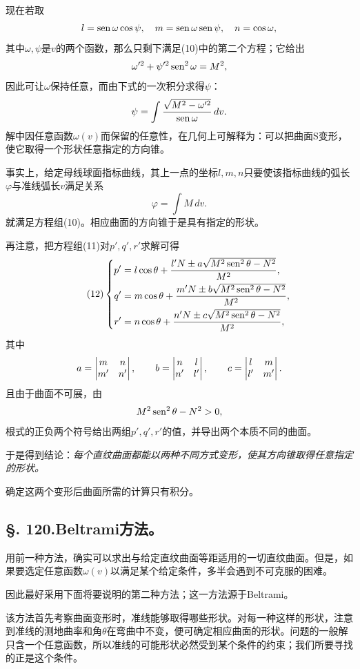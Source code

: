 现在若取
\[
 l=\operatorname{sen}\omega\cos\psi,
 \quad
 m=\operatorname{sen}\omega\operatorname{sen}\psi,
 \quad
 n=\cos\omega,
\]
其中\(\omega,\psi\)是\(v\)的两个函数，那么只剩下满足(10)中的第二个方程；它给出
\[
 \omega'^2+\psi'^2\operatorname{sen}^2\omega=M^2,
\]
因此可让\(\omega\)保持任意，而由下式的一次积分求得\(\psi\)：
\[
 \psi=\int\frac{\sqrt{M^2-\omega'^2}}{\operatorname{sen}\omega}\,dv.
\]
解中因任意函数\(\omega(v)\)而保留的任意性，在几何上可解释为：可以把曲面S变形，使它取得一个形状任意指定的方向锥。

事实上，给定母线球面指标曲线，其上一点的坐标\(l,m,n\)只要使该指标曲线的弧长\(\varphi\)与准线弧长\(v\)满足关系
\[
 \varphi=\int M\,dv.
\]
就满足方程组(10)。相应曲面的方向锥于是具有指定的形状。

再注意，把方程组(11)对\(p',q',r'\)求解可得
\begin{equation}\tag{12}
\left\{
\begin{aligned}
 p'&=l\cos\theta+\frac{l'N\pm a\sqrt{M^2\operatorname{sen}^2\theta-N^2}}{M^2},\\
 q'&=m\cos\theta+\frac{m'N\pm b\sqrt{M^2\operatorname{sen}^2\theta-N^2}}{M^2},\\
 r'&=n\cos\theta+\frac{n'N\pm c\sqrt{M^2\operatorname{sen}^2\theta-N^2}}{M^2},
\end{aligned}
\right.
\end{equation}
其中
\[
 a=\left|\begin{matrix}m&n\\ m'&n'\end{matrix}\right|,
 \qquad
 b=\left|\begin{matrix}n&l\\ n'&l'\end{matrix}\right|,
 \qquad
 c=\left|\begin{matrix}l&m\\ l'&m'\end{matrix}\right|.
\]
且由于曲面不可展，由
\[
 M^2\operatorname{sen}^2\theta-N^2>0,
\]
根式的正负两个符号给出两组\(p',q',r'\)的值，并导出两个本质不同的曲面。

于是得到结论：\emph{每个直纹曲面都能以两种不同方式变形，使其方向锥取得任意指定的形状。}

确定这两个变形后曲面所需的计算只有积分。

\subsection*{\S. 120.\quad Beltrami方法。}

用前一种方法，确实可以求出与给定直纹曲面等距适用的一切直纹曲面。但是，如果要选定任意函数\(\omega(v)\)以满足某个给定条件，多半会遇到不可克服的困难。

因此最好采用下面将要说明的第二种方法；这一方法源于Beltrami。

该方法首先考察曲面变形时，准线能够取得哪些形状。对每一种这样的形状，注意到准线的测地曲率和角\(\theta\)在弯曲中不变，便可确定相应曲面的形状。问题的一般解只含一个任意函数，所以准线的可能形状必然受到某个条件的约束；我们所要寻找的正是这个条件。

